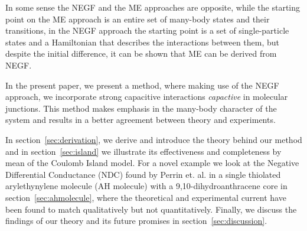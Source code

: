 \documentclass{article}
\begin{document}
\begin{multicols}{2}
        In some sense the NEGF and the ME approaches are opposite, while the starting point on the ME approach is an entire set of many-body states and their transitions, in the NEGF approach the starting point is a set of single-particle states and a Hamiltonian that describes the interactions between them, but despite the initial difference, it can be shown that ME can be derived from NEGF.
            
        In the present paper, we present a method, where making use of the NEGF approach, we incorporate strong capacitive interactions \emph{capactive} in molecular junctions. This method makes emphasis in the many-body character of the system and results in a better agreement between theory and experiments.
        
        In section~\ref{sec:derivation}, we derive and introduce the theory behind our method and in section~\ref{sec:island} we illustrate its effectiveness and completeness by mean of the Coulomb Island model. For a novel example we look at the Negative Differential Conductance (NDC) found by Perrin et. al. \cite{perrinnano} in a single thiolated arylethynylene molecule (AH molecule) with a 9,10-dihydroanthracene core in section~\ref{sec:ahmolecule}, where the theoretical and experimental current have been found to match qualitatively but not quantitatively. Finally, we discuss the findings of our theory and its future promises in section~\ref{sec:discussion}.

    

\end{multicols}
\end{document}
